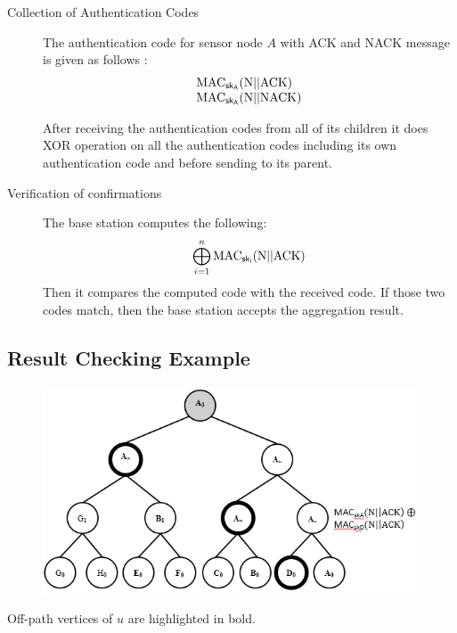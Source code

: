 \documentclass[%
  slidesonly,%
  semlayer%
  ]{seminar}                                  %
\newcommand{\sk}{\sf{sk}}
\begin{document}
\begin{slide}
\begin{description}
      \item[Collection of Authentication Codes] 
      
        The authentication code for sensor node $A$ with ACK and NACK message is given as follows :
        \begin{equation*}
          \begin{array}{l}
            \mbox{MAC}_{\sk_{A}}( \mbox{N} || \mbox{ACK})\\
            \mbox{MAC}_{\sk_{A}}( \mbox{N} || \mbox{NACK})  
          \end{array}
        \end{equation*}

        After receiving the authentication codes from all of its children it does XOR operation on all the authentication codes including its own authentication code and before sending to its parent.

      \item[Verification of confirmations]
        The base station computes the following:
        \begin{equation*}
          \bigoplus_{i = 1}^n \mbox{MAC}_{\sk_{i}}(\mbox{N} || \mbox{ACK})
        \end{equation*}
        Then it compares the computed code with the received code. 
        If those two codes match, then the base station accepts the aggregation result.

      \end{description}
      \vfill
      \clearpage
    \subsection*{Result Checking Example}
      \vfill
      \begin{figure}
          \centering
          \includegraphics[scale = 0.4]{images/off-path.png}
        \end{figure}
        \vfill
        \begin{center}
          \begin{small}
            Off-path vertices of $u$ are highlighted in bold.
          \end{small}
        \end{center}
        \vfill
        \clearpage

\end{slide}
\end{document}
